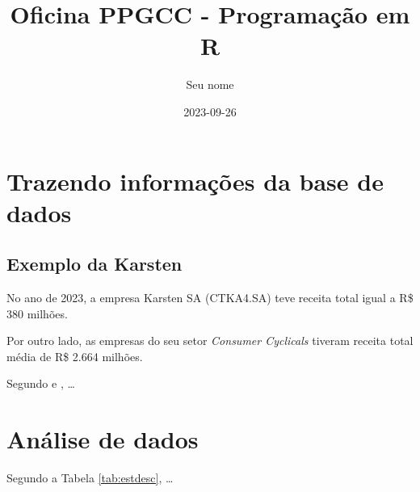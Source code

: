 \documentclass[
]{article}
\title{Oficina PPGCC - Programação em R}
\author{Seu nome}
\date{2023-09-26}
\begin{document}
\maketitle

\hypertarget{trazendo-informauxe7uxf5es-da-base-de-dados}{%
\section{Trazendo informações da base de dados}\label{trazendo-informauxe7uxf5es-da-base-de-dados}}

\hypertarget{exemplo-da-karsten}{%
\subsection{Exemplo da Karsten}\label{exemplo-da-karsten}}

No ano de 2023, a empresa Karsten SA (CTKA4.SA) teve receita total igual a R\$ 380 milhões.

Por outro lado, as empresas do seu setor \emph{Consumer Cyclicals} tiveram receita total média de R\$ 2.664 milhões.

Segundo \citet{matsumoto2012} e \citet{dias2023balancing}, \ldots{}

\hypertarget{anuxe1lise-de-dados}{%
\section{Análise de dados}\label{anuxe1lise-de-dados}}

Segundo a Tabela \ref{tab:estdesc}, \ldots{}
\end{document}
